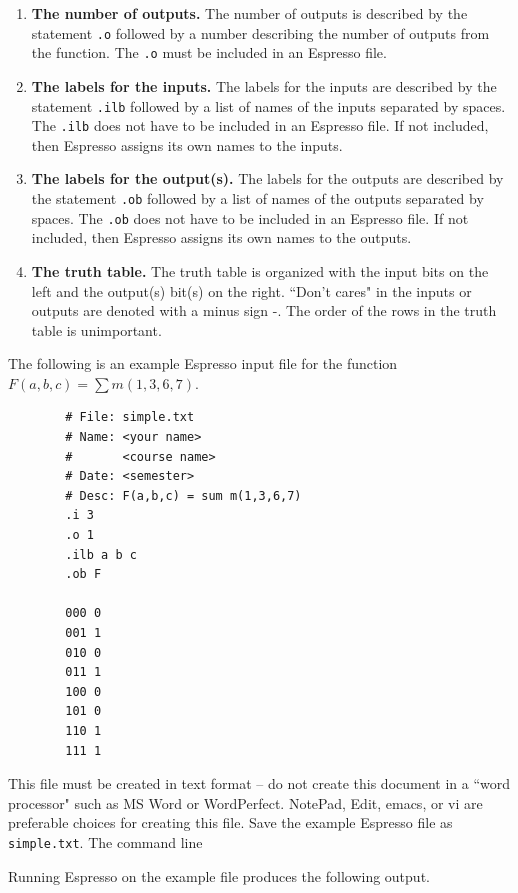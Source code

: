 \begin{process:minimizationKmap}
\begin{enumerate}
\item {\bf The number of outputs.}
The number of outputs 
is described by the statement \verb+.o+ followed by 
a number describing the number of outputs from the function. 
The \verb+.o+ must be included in an Espresso file.

\item {\bf The labels for the inputs.}
The labels for the inputs are described by the statement \verb+.ilb+ 
followed by a list of names of the inputs separated by spaces.  
The \verb+.ilb+ does not have to be included in an
Espresso file.  If not included, then Espresso assigns its
own names to the inputs.

\item {\bf The labels for the output(s).}
The labels for the outputs are described by the statement \verb+.ob+ 
followed by a list of names of the outputs separated by spaces.
The \verb+.ob+ does not have to be included in an
Espresso file.  If not included, then Espresso assigns its
own names to the outputs.

\item {\bf The truth table.}
The truth table is organized with the input bits on the left and the 
output(s) bit(s) on the right.  ``Don't cares" in the inputs or outputs
are denoted with a minus sign -.  The order of the rows in the truth
table is unimportant.  

\end{enumerate}

The following is an example Espresso input file for the function
$F(a,b,c) = \sum m(1,3,6,7)$.  

\begin{verbatim}
        # File: simple.txt
        # Name: <your name>
        #       <course name>
        # Date: <semester>
        # Desc: F(a,b,c) = sum m(1,3,6,7)
        .i 3
        .o 1
        .ilb a b c
        .ob F
        
        000 0
        001 1
        010 0
        011 1
        100 0
        101 0
        110 1
        111 1
\end{verbatim}

This file must be created in text format -- do not create this document
in a ``word processor" such as MS Word or WordPerfect.  NotePad, Edit, 
emacs, or vi are preferable choices for creating this file.  Save 
the example Espresso file as \verb+simple.txt+.  The command
line 

Running
Espresso on the example file produces the following output.


\end{process:minimizationKmap}
